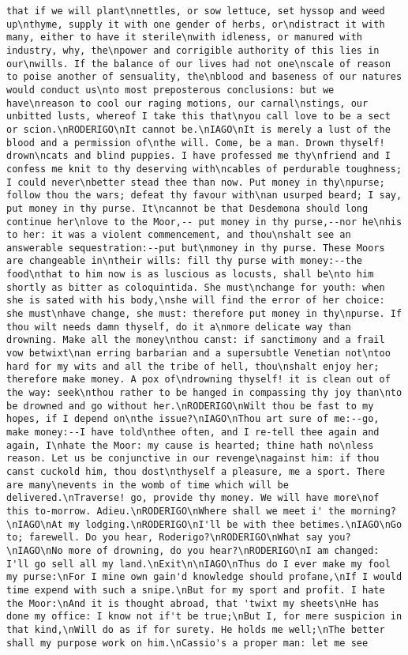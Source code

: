 \begin{verbatim}
that if we will plant\nnettles, or sow lettuce, set hyssop and weed up\nthyme, supply it with one gender of herbs, or\ndistract it with many, either to have it sterile\nwith idleness, or manured with industry, why, the\npower and corrigible authority of this lies in our\nwills. If the balance of our lives had not one\nscale of reason to poise another of sensuality, the\nblood and baseness of our natures would conduct us\nto most preposterous conclusions: but we have\nreason to cool our raging motions, our carnal\nstings, our unbitted lusts, whereof I take this that\nyou call love to be a sect or scion.\nRODERIGO\nIt cannot be.\nIAGO\nIt is merely a lust of the blood and a permission of\nthe will. Come, be a man. Drown thyself! drown\ncats and blind puppies. I have professed me thy\nfriend and I confess me knit to thy deserving with\ncables of perdurable toughness; I could never\nbetter stead thee than now. Put money in thy\npurse; follow thou the wars; defeat thy favour with\nan usurped beard; I say, put money in thy purse. It\ncannot be that Desdemona should long continue her\nlove to the Moor,-- put money in thy purse,--nor he\nhis to her: it was a violent commencement, and thou\nshalt see an answerable sequestration:--put but\nmoney in thy purse. These Moors are changeable in\ntheir wills: fill thy purse with money:--the food\nthat to him now is as luscious as locusts, shall be\nto him shortly as bitter as coloquintida. She must\nchange for youth: when she is sated with his body,\nshe will find the error of her choice: she must\nhave change, she must: therefore put money in thy\npurse. If thou wilt needs damn thyself, do it a\nmore delicate way than drowning. Make all the money\nthou canst: if sanctimony and a frail vow betwixt\nan erring barbarian and a supersubtle Venetian not\ntoo hard for my wits and all the tribe of hell, thou\nshalt enjoy her; therefore make money. A pox of\ndrowning thyself! it is clean out of the way: seek\nthou rather to be hanged in compassing thy joy than\nto be drowned and go without her.\nRODERIGO\nWilt thou be fast to my hopes, if I depend on\nthe issue?\nIAGO\nThou art sure of me:--go, make money:--I have told\nthee often, and I re-tell thee again and again, I\nhate the Moor: my cause is hearted; thine hath no\nless reason. Let us be conjunctive in our revenge\nagainst him: if thou canst cuckold him, thou dost\nthyself a pleasure, me a sport. There are many\nevents in the womb of time which will be delivered.\nTraverse! go, provide thy money. We will have more\nof this to-morrow. Adieu.\nRODERIGO\nWhere shall we meet i' the morning?\nIAGO\nAt my lodging.\nRODERIGO\nI'll be with thee betimes.\nIAGO\nGo to; farewell. Do you hear, Roderigo?\nRODERIGO\nWhat say you?\nIAGO\nNo more of drowning, do you hear?\nRODERIGO\nI am changed: I'll go sell all my land.\nExit\n\nIAGO\nThus do I ever make my fool my purse:\nFor I mine own gain'd knowledge should profane,\nIf I would time expend with such a snipe.\nBut for my sport and profit. I hate the Moor:\nAnd it is thought abroad, that 'twixt my sheets\nHe has done my office: I know not if't be true;\nBut I, for mere suspicion in that kind,\nWill do as if for surety. He holds me well;\nThe better shall my purpose work on him.\nCassio's a proper man: let me see 
\end{verbatim}
